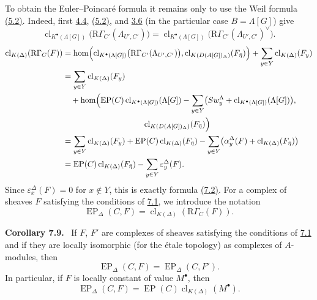 \documentclass[11pt]{article}
\newenvironment{statement}[1]{\par\medskip\noindent\textbf{#1.}\ }{\par\medskip}
\providecommand{\cl}{\operatorname{cl}}
\providecommand{\EP}{\operatorname{EP}}
\providecommand{\cl}{\operatorname{cl}}
\providecommand{\EP}{\operatorname{EP}}
\providecommand{\clK}[1]{\operatorname{cl}_{K(#1)}}
\providecommand{\clKstar}[1]{\operatorname{cl}_{K^{\bullet}(#1)}}
\providecommand{\RG}{\mathrm R\Gamma}
\providecommand{\cl}{\operatorname{cl}}
\begin{document}
To obtain the Euler--Poincaré formula it remains only to use the Weil formula \hyperref[sga5:X:equation:5.2]{(5.2)}. Indeed, first \hyperref[sga5:X:proposition:4.4]{4.4}, \hyperref[sga5:X:equation:5.2]{(5.2)}, and \hyperref[sga5:X:proposition:3.6]{3.6} (in the particular case $B=\Lambda[G]$) give
\[
\clKstar{\Lambda[G]}\bigl(\RG_{C'}(\Lambda_{U',C'})\bigr)
=
\clKstar{\Lambda[G]}\bigl(\RG_{C'}(\Lambda_{U',C'})^\vee\bigr).
\]
\[
\begin{aligned}
\clK{\Delta}(\RG_C(F))
&=\operatorname{hom}\Bigl(
\clKstar{\Lambda[G]}\bigl(\RG_{C'}(\Lambda_{U',C'})\bigr),
\cl_{K(D(A[G])_\Delta)}(F_{\bar\eta})\Bigr)
 +\sum_{y\in Y}\clK{\Delta}(F_y)\\
&=\sum_{y\in Y}\clK{\Delta}(F_y)\\
&\quad +\operatorname{hom}\Bigl(
\EP(C)\clKstar{\Lambda[G]}(\Lambda[G])
 -\sum_{y\in Y}\bigl(Sw_y^{\Lambda}+\clKstar{\Lambda[G]}(\Lambda[G])\bigr),\\
&\hspace{10em}\cl_{K(D(A[G])_\Delta)}(F_{\bar\eta})\Bigr)\\
&=\sum_{y\in Y}\clK{\Delta}(F_y)
 +\EP(C)\clK{\Delta}(F_{\bar\eta})
 -\sum_{y\in Y}\bigl(\alpha_y^\Delta(F)+\clK{\Delta}(F_{\bar\eta})\bigr)\\
&=\EP(C)\clK{\Delta}(F_{\bar\eta})
 -\sum_{y\in Y}\varepsilon_y^\Delta(F).
\end{aligned}
\]
Since $\varepsilon_x^\Delta(F)=0$ for $x\notin Y$, this is exactly formula \hyperref[sga5:X:equation:7.2]{(7.2)}. For a complex of sheaves $F$ satisfying the conditions of \hyperref[sga5:X:theorem:7.1]{7.1}, we introduce the notation
\[
\EP_\Delta(C,F)=\clK{\Delta}(\RG_C(F)).
\]

\label{sga5:X:corollary:7.9}\begin{statement}{Corollary 7.9}
If $F$, $F'$ are complexes of sheaves satisfying the conditions of \hyperref[sga5:X:theorem:7.1]{7.1} and if they are locally isomorphic (for the étale topology) as complexes of $A$-modules, then
\[
\EP_\Delta(C,F)=\EP_\Delta(C,F').
\tag{7.10}\label{sga5:X:equation:7.10}
\]
In particular, if $F$ is locally constant of value $M^\bullet$, then
\[
\EP_\Delta(C,F)=\EP(C)\clK{\Delta}(M^\bullet).
\tag{7.11}\label{sga5:X:equation:7.11}
\]
\end{statement}
\end{document}
